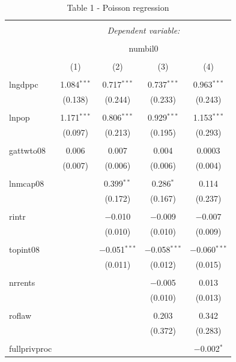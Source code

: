 \documentclass[]{book}
\begin{document}
\begin{table}[!htbp] \centering
  \caption{Table 1 - Poisson regression}
  \label{tab:}
\begin{tabular}{@{\extracolsep{5pt}}lcccc}
\\[-1.8ex]\hline
\hline \\[-1.8ex]
 & \multicolumn{4}{c}{\textit{Dependent variable:}} \\
\cline{2-5}
\\[-1.8ex] & \multicolumn{4}{c}{numbil0} \\
\\[-1.8ex] & (1) & (2) & (3) & (4)\\
\hline \\[-1.8ex]
 lngdppc & 1.084$^{***}$ & 0.717$^{***}$ & 0.737$^{***}$ & 0.963$^{***}$ \\
  & (0.138) & (0.244) & (0.233) & (0.243) \\
  & & & & \\
 lnpop & 1.171$^{***}$ & 0.806$^{***}$ & 0.929$^{***}$ & 1.153$^{***}$ \\
  & (0.097) & (0.213) & (0.195) & (0.293) \\
  & & & & \\
 gattwto08 & 0.006 & 0.007 & 0.004 & 0.0003 \\
  & (0.007) & (0.006) & (0.006) & (0.004) \\
  & & & & \\
 lnmcap08 &  & 0.399$^{**}$ & 0.286$^{*}$ & 0.114 \\
  &  & (0.172) & (0.167) & (0.237) \\
  & & & & \\
 rintr &  & $-$0.010 & $-$0.009 & $-$0.007 \\
  &  & (0.010) & (0.010) & (0.009) \\
  & & & & \\
 topint08 &  & $-$0.051$^{***}$ & $-$0.058$^{***}$ & $-$0.060$^{***}$ \\
  &  & (0.011) & (0.012) & (0.015) \\
  & & & & \\
 nrrents &  &  & $-$0.005 & 0.013 \\
  &  &  & (0.010) & (0.013) \\
  & & & & \\
 roflaw &  &  & 0.203 & 0.342 \\
  &  &  & (0.372) & (0.283) \\
  & & & & \\
 fullprivproc &  &  &  & $-$0.002$^{*}$ \\

\end{tabular}
\end{table}
\end{document}

